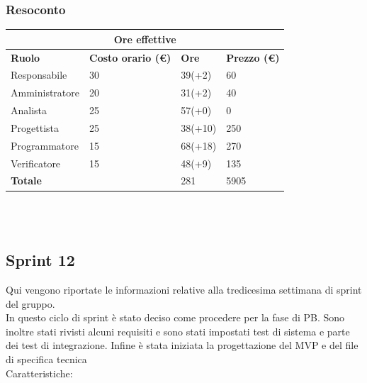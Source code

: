 \documentclass[9pt]{article}
\begin{document}
\subsubsection{Resoconto}
\begin{center}
	\begin{tabularx}{\textwidth}{|X|X|X|X|}
		\hline
		\multicolumn{4}{|c|}{\textbf{Ore effettive}}                                      \\
		\hline
		\hline
		\textbf{Ruolo}  & \textbf{Costo orario (\euro)} & \textbf{Ore} & \textbf{Prezzo (\euro)} \\
		\hline
		Responsabile    & 30                            & 39(+2)       & 60                      \\
		\hline
		Amministratore  & 20                            & 31(+2)       & 40                      \\
		\hline
		Analista        & 25                            & 57(+0)       & 0                       \\
		\hline
		Progettista     & 25                            & 38(+10)       & 250                     \\
		\hline
		Programmatore   & 15                            & 68(+18)       & 270                     \\
		\hline
		Verificatore    & 15                            & 48(+9)       & 135                      \\
		\hline
		\hline
		\textbf{Totale} &                               & 281          & 5905                    \\
		\hline
	\end{tabularx}\\[8pt]
	\mbox{}\\
\end{center}

\subsection{Sprint 12}
Qui vengono riportate le informazioni relative alla tredicesima settimana di sprint del gruppo. \\
In questo ciclo di sprint è stato deciso come procedere per la fase di PB. 
Sono inoltre stati rivisti alcuni requisiti e sono stati impostati test di sistema e parte dei test di integrazione.
Infine è stata iniziata la progettazione del MVP e del file di specifica tecnica \\

Caratteristiche:
\end{document}
